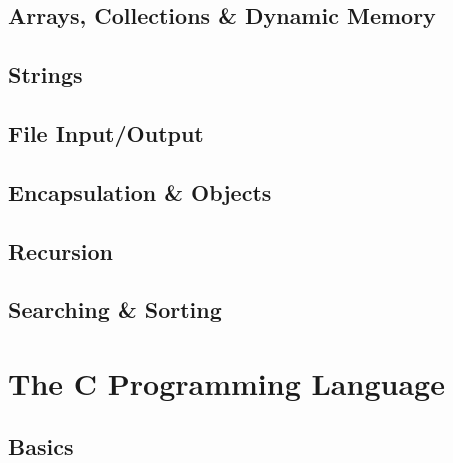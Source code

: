 \documentclass[12pt]{scrbook}
\begin{document}
\chapter{Arrays, Collections \& Dynamic Memory}
\label{chapter:arrays}



\chapter{Strings}
\label{chapter:strings}



\chapter{File Input/Output}
\label{chapter:fileIO}



\chapter{Encapsulation \& Objects}
\label{chapter:objects}



\chapter{Recursion}
\label{chapter:recursion}



\chapter{Searching \& Sorting}
\label{chapter:searchingSorting}







\part{The C Programming Language}

\chapter{Basics}

\end{document}
